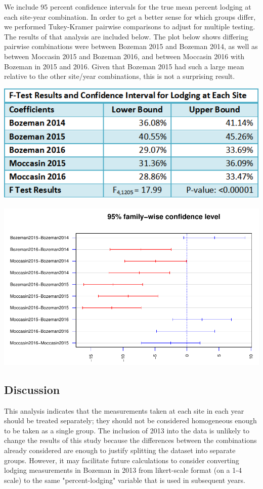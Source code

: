 \documentclass[11pt]{article}\usepackage[]{graphicx}\usepackage[]{color}
\makeatletter
\def\maxwidth{ %
  \ifdim\Gin@nat@width>\linewidth
    \linewidth
  \else
    \Gin@nat@width
  \fi
}
\newenvironment{knitrout}{}{} %
\makeatother
\begin{document}
We include 95 percent confidence intervals for the true mean percent lodging at each site-year combination. In order to get a better sense for which groups differ, we performed Tukey-Kramer pairwise comparisons to adjust for multiple testing. The results of that analysis are included below. The plot below shows differing pairwise combinations were between Bozeman 2015 and Bozeman 2014, as well as between Moccasin 2015 and Bozeman 2016, and between Moccasin 2016 with Bozeman in 2015 and 2016. Given that Bozeman 2015 had such a large mean relative to the other site/year combinations, this is not a surprising result. 
  
\includegraphics [width = 4.5 in] {RegressionResults}


\begin{knitrout}\footnotesize
{}\color{fgcolor}

{\centering \includegraphics[width=\maxwidth]{figure/tukey-1} 

}



\end{knitrout}


\subsection{Discussion}
This analysis indicates that the measurements taken at each site in each year should be treated separately; they should not be considered homogeneous enough to be taken as a single group.  The inclusion of 2013 into the data is unlikely to change the results of this study because the differences between the combinations already considered are enough to justify splitting the dataset into separate groups.  However, it may facilitate future calculations to consider converting lodging measurements in Bozeman in 2013 from likert-scale format (on a 1-4 scale) to the same "percent-lodging" variable that is used in subsequent years. 
\end{document}
